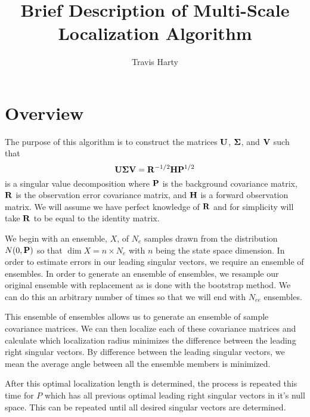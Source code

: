 \documentclass[11pt]{amsart}
\title{Brief Description of Multi-Scale Localization Algorithm}
\author{Travis Harty}
\begin{document}
\maketitle

\section{Overview}
The purpose of this algorithm is to construct the matrices $\bold{U}$, $\bold{\Sigma}$, and $\bold{V}$ such that
\[
\bold{U}\bold{\Sigma}\bold{V} = \bold{R}^{-1/2} \bold{H} \bold{P}^{1/2}
\]
is a singular value decomposition where $\bold{P}$ is the background covariance matrix, $\bold{R}$ is the observation error covariance matrix, and $\bold{H}$ is a forward observation matrix.
We will assume we have perfect knowledge of $\bold{R}$ and for simplicity will take $\bold{R}$ to be equal to the identity matrix.

We begin with an ensemble, $X$, of $N_e$ samples drawn from the distribution $N(0, \bold{P})$ so that $\dim{X} = n \times N_e$ with $n$ being the state space dimension.
In order to estimate errors in our leading singular vectors, we require an ensemble of ensembles.
In order to generate an ensemble of ensembles, we resample our original ensemble with replacement as is done with the bootstrap method.
We can do this an arbitrary number of times so that we will end with $N_{ee}$ ensembles.

This ensemble of ensembles allows us to generate an ensemble of sample covariance matrices.
We can then localize each of these covariance matrices and calculate which localization radius minimizes the difference between the leading right singular vectors.
By difference between the leading singular vectors, we mean the average angle between all the ensemble members is minimized.

After this optimal localization length is determined, the process is repeated this time for $P$ which has all previous optimal leading right singular vectors in it's null space.
This can be repeated until all desired singular vectors are determined.
\end{document}
